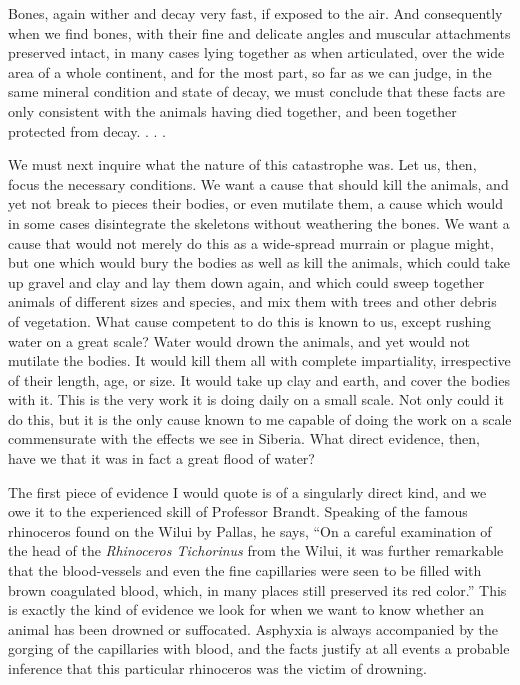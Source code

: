 Bones, again wither and decay very fast, if exposed to the air. And consequently when we
find bones, with their fine and delicate angles and muscular attachments preserved intact, in
many cases lying together as when articulated, over the wide area of a whole continent, and
for the most part, so far as we can judge, in the same mineral condition and state of decay, we
must conclude that these facts are only consistent with the animals having died together, and
been together protected from decay. . . .

We must next inquire what the nature of this catastrophe was. Let us, then, focus the
necessary conditions. We want a cause that should kill the animals, and yet not break to
pieces their bodies, or even mutilate them, a cause which would in some cases disintegrate
the skeletons without weathering the bones. We want a cause that would not merely do this
as a wide-spread murrain or plague might, but one which would bury the bodies as well as
kill the animals, which could take up gravel and clay and lay them down again, and which
could sweep together animals of different sizes and species, and mix them with trees and
other debris of vegetation. What cause competent to do this is known to us, except rushing
water on a great scale? Water would drown the animals, and yet would not mutilate the
bodies. It would kill them all with complete impartiality, irrespective of their length, age, or
size. It would take up clay and earth, and cover the bodies with it. This is the very work it is
doing daily on a small scale. Not only could it do this, but it is the only cause known to me
capable of doing the work on a scale commensurate with the effects we see in Siberia. What
direct evidence, then, have we that it was in fact a great flood of water?

The first piece of evidence I would quote is of a singularly direct kind, and we owe it to the
experienced skill of Professor Brandt. Speaking of the famous rhinoceros found on the Wilui
by Pallas, he says, ``On a careful examination of the head of the \textit{Rhinoceros Tichorinus} from
the Wilui, it was further remarkable that the blood-vessels and even the fine capillaries were
seen to be filled with brown coagulated blood, which, in many places still preserved its red
color.'' This is exactly the kind of evidence we look for when we want to know whether an
animal has been drowned or suffocated. Asphyxia is always accompanied by the gorging of
the capillaries with blood, and the facts justify at all events a probable inference that this
particular rhinoceros was the victim of drowning.

